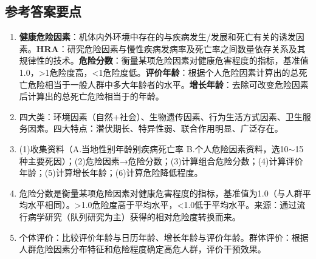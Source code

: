 \subsection*{参考答案要点}

\begin{enumerate}[leftmargin=*, itemsep=5pt]
    \item \textbf{健康危险因素}：机体内外环境中存在的与疾病发生/发展和死亡有关的诱发因素。\textbf{HRA}：研究危险因素与慢性疾病发病率及死亡率之间数量依存关系及其规律性的技术。\textbf{危险分数}：衡量某项危险因素对健康危害程度的指标，基准值1.0，>1危险度高，<1危险度低。\textbf{评价年龄}：根据个人危险因素计算出的总死亡危险相当于一般人群中多大年龄者的水平。\textbf{增长年龄}：去除可改变危险因素后计算出的总死亡危险相当于的年龄。
    \item 四大类：环境因素（自然+社会）、生物遗传因素、行为生活方式因素、卫生服务因素。四大特点：潜伏期长、特异性弱、联合作用明显、广泛存在。
    \item (1)收集资料（A.当地性别年龄别疾病死亡率 B.个人危险因素资料，选10$\sim$15种主要死因）；(2)危险因素→危险分数；(3)计算组合危险分数；(4)计算评价年龄；(5)计算增长年龄；(6)计算危险降低程度。
    \item 危险分数是衡量某项危险因素对健康危害程度的指标，基准值为1.0（与人群平均水平相同）。>1.0危险度高于平均水平，<1.0低于平均水平。来源：通过流行病学研究（队列研究为主）获得的相对危险度转换而来。
    \item 个体评价：比较评价年龄与日历年龄、增长年龄与评价年龄。群体评价：根据人群危险因素分布特征和危险程度确定高危人群，评价干预效果。
\end{enumerate}

\newpage
